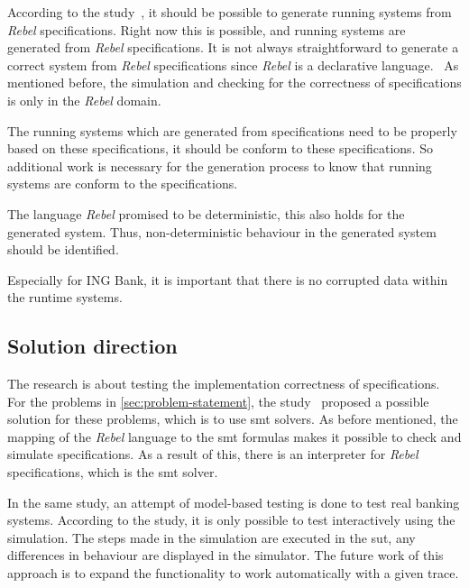 
According to the study~\cite[p.~3]{stoel2015case}, it should be possible to generate
running systems from \textit{Rebel} specifications. Right now this is possible, and
running systems are generated from \textit{Rebel} specifications. It is not always straightforward to generate a correct system from \textit{Rebel}
specifications since \textit{Rebel} is a declarative language.~\cite[p.~3]{stoel2015case}
As mentioned before, the simulation and checking for the correctness of
specifications is only in the \textit{Rebel} domain.

The running systems which are
generated from specifications need to be properly based on these specifications,
it should be conform to these specifications. So additional work is necessary for
the generation process to know that running systems are conform to the
specifications.

The language \textit{Rebel} promised to be deterministic, this also holds
for the generated system. Thus, non-deterministic behaviour in the generated
system should be identified.

Especially for ING Bank, it is important that there is no corrupted data within
the runtime systems.

\subsection{Solution direction}\label{sec:solution-direction}

The research is about testing the implementation correctness of specifications.
For the problems in \autoref{sec:problem-statement}, the
study~\cite[p.3]{stoel2015case} proposed a possible solution for these problems,
which is to use \gls{smt} solvers. As before mentioned, the mapping of the \textit{Rebel}
language to the \gls{smt} formulas makes it possible to check and simulate
specifications. As a result of this, there is an interpreter for \textit{Rebel}
specifications, which is the \gls{smt}
solver.~\cite[p.5]{stoel_storm_vinju_bosman_2016}

In the same study,
an attempt of model-based testing is done to test real banking systems.
According to the study, it is only possible to test interactively using the
simulation. The steps made in the simulation are executed in the \gls{sut}, any
differences in behaviour are displayed in the simulator. The future work of this
approach is to expand the functionality to work automatically with a given
trace.


